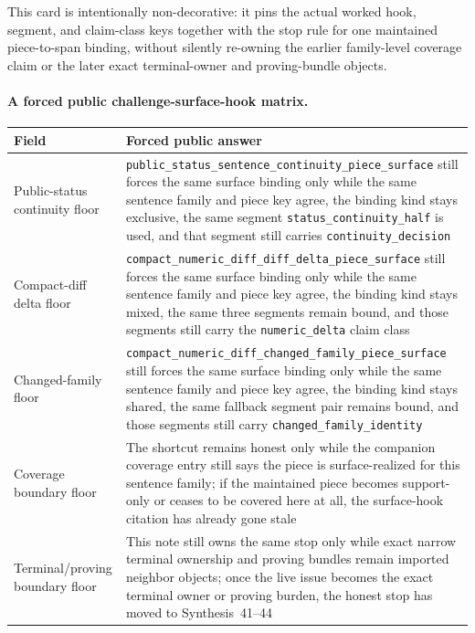 \documentclass[11pt]{article}
\begin{document}
This card is intentionally non-decorative: it pins the actual worked hook, segment, and claim-class keys together with the stop rule for one maintained piece-to-span binding, without silently re-owning the earlier family-level coverage claim or the later exact terminal-owner and proving-bundle objects.\cite{series:workedexample}

\paragraph{A forced public challenge-surface-hook matrix.}
\begin{table}[t]
\centering
\small
\begin{tabularx}{\linewidth}{@{}lX@{}}
\toprule
Field & Forced public answer \\
\midrule
Public-status continuity floor & \nolinkurl{public_status_sentence_continuity_piece_surface} still forces the same surface binding only while the same sentence family and piece key agree, the binding kind stays \textsf{exclusive}, the same segment \nolinkurl{status_continuity_half} is used, and that segment still carries \nolinkurl{continuity_decision} \\
Compact-diff delta floor & \nolinkurl{compact_numeric_diff_diff_delta_piece_surface} still forces the same surface binding only while the same sentence family and piece key agree, the binding kind stays \textsf{mixed}, the same three segments remain bound, and those segments still carry the \nolinkurl{numeric_delta} claim class \\
Changed-family floor & \nolinkurl{compact_numeric_diff_changed_family_piece_surface} still forces the same surface binding only while the same sentence family and piece key agree, the binding kind stays \textsf{shared}, the same fallback segment pair remains bound, and those segments still carry \nolinkurl{changed_family_identity} \\
Coverage boundary floor & The shortcut remains honest only while the companion coverage entry still says the piece is \textsf{surface}-realized for this sentence family; if the maintained piece becomes support-only or ceases to be covered here at all, the surface-hook citation has already gone stale \\
Terminal/proving boundary floor & This note still owns the same stop only while exact narrow terminal ownership and proving bundles remain imported neighbor objects; once the live issue becomes the exact terminal owner or proving burden, the honest stop has moved to Synthesis~41--44 \\

\end{tabularx}
\end{table}
\end{document}
